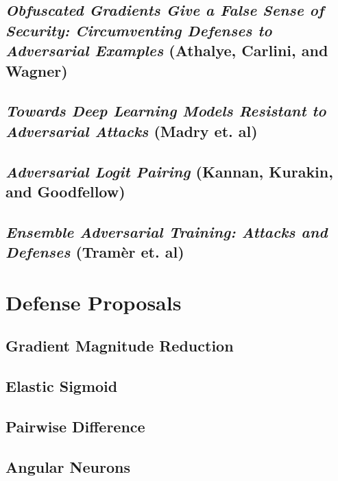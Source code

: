 \documentclass[showabstract,showacknowledgments,showpreface,showdedication]{iuphd}
\begin{document}
\subsection{\textit{Obfuscated Gradients Give a False Sense of Security: Circumventing Defenses to Adversarial Examples} (Athalye, Carlini, and Wagner)}

\label{oggafsoscdtae}
\subsection{\textit{Towards Deep Learning Models Resistant to Adversarial Attacks} (Madry et. al)}
\label{tdlmrtaa}

\subsection{\textit{Adversarial Logit Pairing} (Kannan, Kurakin, and Goodfellow)}

\subsection{\textit{Ensemble Adversarial Training: Attacks and Defenses} (Tramèr et. al)}


\section{Defense Proposals}

\subsection{Gradient Magnitude Reduction}
\label{gradientmagnitudereduction}


\subsection{Elastic Sigmoid}


\subsection{Pairwise Difference}


\subsection{Angular Neurons}
\label{cosineneurons}

\end{document}
